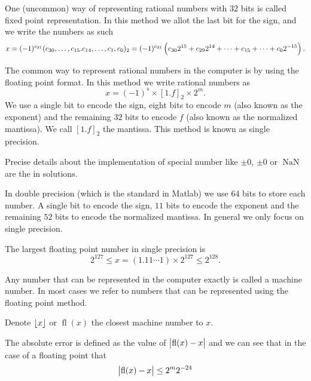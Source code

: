 \documentclass[11pt,a4paper]{article}
\DeclareMathOperator{\fl}{fl}
\DeclareMathOperator{\NaN}{NaN}
\begin{document}
\begin{definition}
  One (uncommon) way of representing rational numbers with $32$ bits is
  called fixed point representation.
  In this method we allot the last bit for the sign,
  and we write the numbers as such
  \[
    x =
    (-1)^{c_{31}} (c_{30},\dots,c_{15}.c_{14},\dots,c_1,c_0)_{2} =
    (-1)^{c_{31}}
    \del{c_{30} 2^{15} + c_{29} 2^{14} +
    \cdots + c_{15} + \cdots + c_0 2^{-15}}.
  \]
\end{definition}

\begin{definition}
  The common way to represent rational numbers in the computer is by
  using the floating point format.
  In this method we write rational numbers as
  \[
    x = (-1)^s \times [1.f]_2 \times 2^m.
  \]
  We use a single bit to encode the sign, eight bits to encode $m$ (also
  known as the exponent) and the remaining $32$ bits to encode $f$ (also known
  as the normalized mantissa). We call $[1.f]_2$ the mantissa.
  This method is known as single precision.

  Precise details about the implementation of special number like
  $\pm 0$, $\pm 0$ or $\NaN$ are the in solutions.

  In double precision (which is the standard in Matlab) we use $64$ bits
  to store each number. A single bit to encode the sign, $11$ bits to encode 
  the exponent and the remaining $52$ bits to encode the normalized mantissa.
  In general we only focus on single precision.

  The largest floating point number in single precision is
  \[
    2^{127} \le
    x = (1.1 1 \cdots 1) \times 2^{127} \le
    2^{128}.
  \]

\end{definition}

\begin{definition}
  Any number that can be represented in the computer exactly is called
  a machine number.
  In most cases we refer to numbers that can be represented using the floating
  point method.
\end{definition}

Denote $\left\lfloor x \right\rfloor$ or $\fl(x)$ the closest machine number to $x$.
\begin{definition}
  The absolute error is defined as the value of $\abs{\fl(x) - x}$ and
  we can see that in the case of a floating point that
  \[
    \abs{\fl(x) - x} \le 2^m 2^{-24}
  \]
\end{definition}
\end{document}
